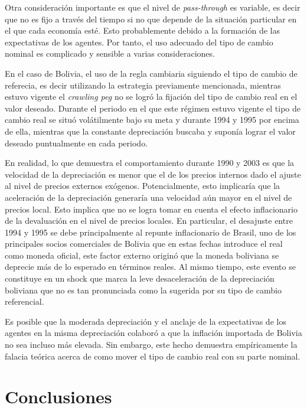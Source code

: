 \documentclass[12pt,letterpaper]{article}
\begin{document}
Otra consideración importante es que el nivel de \emph{pass-through} es variable, es decir que no es fijo a través del tiempo si no que depende de la situación particular en el que cada economía esté. Esto probablemente debido a la formación de las expectativas de los agentes. Por tanto, el uso adecuado del tipo de cambio nominal es complicado y sensible a varias consideraciones.

En el caso de Bolivia, el uso de la regla cambiaria siguiendo el tipo de cambio de referecia, es decir  utilizando la estrategia previamente mencionada, mientras estuvo vigente el \emph{crawling peg} no se logró la fijación del tipo de cambio real en el valor deseado. Durante el periodo en el que este régimen estuvo vigente el tipo de cambio real se situó volátilmente bajo su meta y durante 1994 y 1995 por encima de ella, mientras que la constante depreciación buscaba y suponía lograr el valor deseado puntualmente en cada periodo.

En realidad, lo que demuestra el comportamiento durante 1990 y 2003 es que la velocidad de la depreciación es menor que el de los precios internos dado el ajuste al nivel de precios externos exógenos. Potencialmente, esto implicaría que la aceleración de la depreciación generaría una velocidad aún mayor en el nivel de precios local. Esto implica que no se logra tomar en cuenta el efecto inflacionario de la devaluación en el nivel de precios locales. En particular, el desajuste entre 1994 y 1995 se debe principalmente al repunte inflacionario de Brasil, uno de los principales socios comerciales de Bolivia que en estas fechas introduce el real como moneda oficial, este factor externo originó que la moneda boliviana se deprecie más de lo esperado en términos reales. Al mismo tiempo, este evento se constituye en un shock que marca la leve desaceleración de la depreciación boliviana que no es tan pronunciada como la sugerida por su tipo de cambio referencial.

Es posible que la moderada depreciación y el anclaje de la expectativas de los agentes en la misma depreciación colaboró a que la inflación importada de Bolivia no sea incluso más elevada. Sin embargo, este hecho demuestra empíricamente la falacia teórica acerca de como mover el tipo de cambio real con su parte nominal.











\section{Conclusiones}\label{concl}
\end{document}
